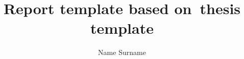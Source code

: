 \documentclass[
    bindingoffset=5mm,  %
    footnoteindent=3mm, %
    hyphenation=true    %
]{src/wut-thesis}
\begin{document}
\title{
        Report template based on~thesis template
}
\author{Name Surname}
\date{\the\year}
\maketitle

\clearpage
\tableofcontents

\clearpage
\pagestyle{headings}

%


\clearpage %


\clearpage
\pagestyle{plain}

\listoffigurestoc    %




\end{document}
